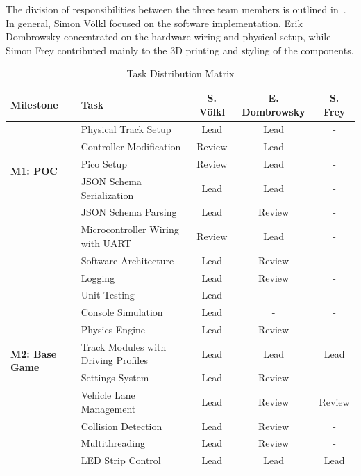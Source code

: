 \documentclass[10pt,journal,final,a4paper]{IEEEtran}
\begin{document}
The division of responsibilities between the three team members is outlined in~. In general, Simon Völkl focused on the software implementation, Erik Dombrowsky concentrated on the hardware wiring and physical setup, while Simon Frey contributed mainly to the 3D printing and styling of the components. 

\begin{table}[htb]
    \centering
    \caption{Task Distribution Matrix}
    \label{tab:task_distribution}
    \footnotesize
    \setlength{\tabcolsep}{4pt}
    \begin{tabularx}{0.68\linewidth}{p{2.5cm} p{4.5cm} c c c}
        \toprule
        \textbf{Milestone} & \textbf{Task} & \textbf{S. Völkl} & \textbf{E. Dombrowsky} & \textbf{S. Frey} \\
        \midrule
        \multirow{5}{2.5cm}{\textbf{M1: POC}}
            & Physical Track Setup & Lead & Lead & - \\
            & Controller Modification & Review & Lead & - \\
            & Pico Setup & Review & Lead & - \\
            & JSON Schema Serialization & Lead & Lead & - \\
            & JSON Schema Parsing & Lead & Review & - \\
            & Microcontroller Wiring with UART & Review & Lead & - \\
        \midrule
        \multirow{11}{2.5cm}{\textbf{M2: Base Game}}
            & Software Architecture & Lead & Review & - \\
            & Logging & Lead & Review & - \\
            & Unit Testing & Lead & - & - \\
            & Console Simulation & Lead & - & - \\
            & Physics Engine & Lead & Review & - \\
            & Track Modules with Driving Profiles & Lead & Lead & Lead \\
            & Settings System & Lead & Review & - \\
            & Vehicle Lane Management & Lead & Review & Review \\
            & Collision Detection & Lead & Review & - \\
            & Multithreading & Lead & Review & - \\
            & LED Strip Control & Lead & Lead & Lead \\

\end{tabularx}
\end{table}
\end{document}
